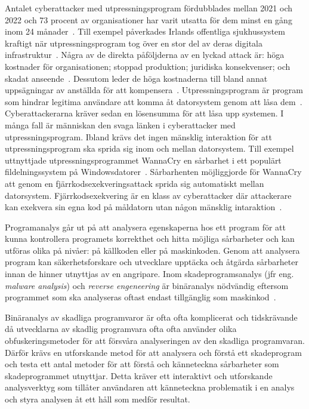 Antalet cyberattacker med utpressningsprogram fördubblades mellan 2021 och 2022 och 73 procent av organisationer har varit utsatta för dem minst en gång inom 24 månader~\cite{cyberreason2021, cyberreason2022}.
Till exempel påverkades Irlands offentliga sjukhussystem kraftigt när utpressningsprogram tog över en stor del av deras digitala infrastruktur~\cite{hse_report, gallagher2023}.
Några av de direkta påföljderna av en lyckad attack är: höga kostnader för organisationen; stoppad produktion; juridiska konsekvenser; och skadat anseende~\cite{cyberreason2021, cyberreason2022}.
Dessutom leder de höga kostnaderna till bland annat uppsägningar av anställda för att kompensera~\cite{cyberreason2021, cyberreason2022}.
Utpressningsprogram är program som hindrar legitima användare att komma åt datorsystem genom att låsa dem~\cite{accessscience_computer_virus}.
Cyberattackerarna kräver sedan en lösensumma för att låsa upp systemen.
I många fall är människan den svaga länken i cyberattacker med utpressningsprogram.
Ibland krävs det ingen mänsklig interaktion för att utpressningsprogram ska sprida sig inom och mellan datorsystem.
Till exempel uttnyttjade utpressningsprogrammet WannaCry en sårbarhet i ett populärt fildelningssystem på Windowsdatorer~\cite{alraddadicomprehensive}.
Sårbarhenten möjliggjorde för WannaCry att genom en fjärrkodsexekveringsattack sprida sig automatiskt mellan datorsystem.
Fjärrkodsexekvering är en klass av cyberattacker där attackerare kan exekvera sin egna kod på måldatorn utan någon mänsklig intaraktion~\cite{baker2022}.

Programanalys går ut på att analysera egenskaperna hos ett program för att kunna kontrollera programets korrekthet och hitta möjliga sårbarheter och kan utföras olika på nivåer: på källkoden eller på maskinkoden.
Genom att analysera program kan säkerhetsforskare och utvecklare upptäcka och åtgärda sårbarheter innan de hinner utnyttjas av en angripare.
Inom skadeprogramsanalys (jfr eng. \emph{malware analysis}) och \emph{reverse engeneering} är binäranalys nödvändig eftersom programmet som ska analyseras oftast endast tillgänglig som maskinkod~\cite{andriesse2018}.

Binäranalys av skadliga programvaror är ofta ofta komplicerat och tidskrävande då utvecklarna av skadlig programvara ofta ofta använder olika obfuskeringsmetoder för att försvåra analyseringen av den skadliga programvaran.
Därför krävs en utforskande metod för att analysera och förstå ett skadeprogram och testa ett antal metoder för att förstå och känneteckna sårbarheter som skadeprogrammet utnyttjar.
Detta kräver ett interaktivt och utforskande analysverktyg som tillåter användaren att känneteckna problematik i en analys och styra analysen åt ett håll som medför resultat.

